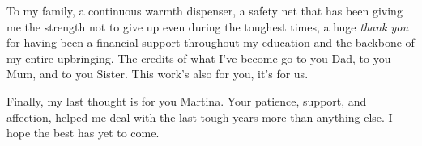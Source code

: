 To my family, a continuous warmth dispenser, a safety net that has been giving me the strength not to give up even during the toughest times, a huge \emph{thank you} for having been a financial support throughout my education and the backbone of my entire upbringing. The credits of what I've become go to you Dad, to you Mum, and to you Sister. This work's also for you, it's for us.

Finally, my last thought is for you Martina. Your patience, support, and affection, helped me deal with the last tough years more than anything else. I hope the best has yet to come.